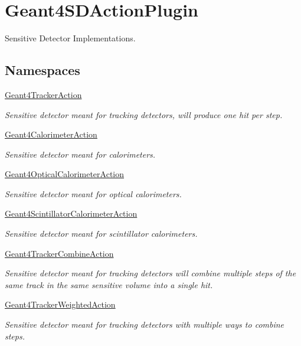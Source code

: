 \hypertarget{group___geant4_s_d_action_plugin}{}\section{Geant4\+S\+D\+Action\+Plugin}
\label{group___geant4_s_d_action_plugin}


Sensitive Detector Implementations.  


\subsection*{Namespaces}
\begin{DoxyCompactItemize}
\item 
 \hyperlink{namespace_geant4_tracker_action}{Geant4\+Tracker\+Action}
\begin{DoxyCompactList}\small\item\em Sensitive detector meant for tracking detectors, will produce one hit per step. \end{DoxyCompactList}\item 
 \hyperlink{namespace_geant4_calorimeter_action}{Geant4\+Calorimeter\+Action}
\begin{DoxyCompactList}\small\item\em Sensitive detector meant for calorimeters. \end{DoxyCompactList}\item 
 \hyperlink{namespace_geant4_optical_calorimeter_action}{Geant4\+Optical\+Calorimeter\+Action}
\begin{DoxyCompactList}\small\item\em Sensitive detector meant for optical calorimeters. \end{DoxyCompactList}\item 
 \hyperlink{namespace_geant4_scintillator_calorimeter_action}{Geant4\+Scintillator\+Calorimeter\+Action}
\begin{DoxyCompactList}\small\item\em Sensitive detector meant for scintillator calorimeters. \end{DoxyCompactList}\item 
 \hyperlink{namespace_geant4_tracker_combine_action}{Geant4\+Tracker\+Combine\+Action}
\begin{DoxyCompactList}\small\item\em Sensitive detector meant for tracking detectors will combine multiple steps of the same track in the same sensitive volume into a single hit. \end{DoxyCompactList}\item 
 \hyperlink{namespace_geant4_tracker_weighted_action}{Geant4\+Tracker\+Weighted\+Action}
\begin{DoxyCompactList}\small\item\em Sensitive detector meant for tracking detectors with multiple ways to combine steps. \end{DoxyCompactList}\end{DoxyCompactItemize}


